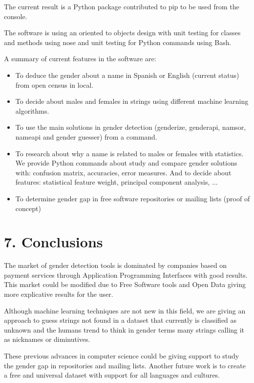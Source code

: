 \documentclass[fleqn,10pt]{wlpeerj} %
\begin{document}
The current result is a Python package contributed to pip to be used
from the console.

The software is using an oriented to objects design with unit testing
for classes and methods using nose and unit testing for Python
commands using Bash. 

A summary of current features in the software are:

\begin{itemize}[noitemsep]
\item To deduce the gender about a name in Spanish or English (current
  status) from open census in local.
\item To decide about males and females in strings using different
  machine learning algorithms.
\item To use the main solutions in gender detection (genderize, genderapi,
namsor, nameapi and gender guesser) from a command.
\item To research about why a name is related to males or females with
  statistics. We provide Python commands about study and compare
  gender solutions with: confusion matrix, accuracies, error
  measures. And to decide about features: statistical feature weight,
  principal component analysis, ...
\item To determine gender gap in free software repositories or mailing
  lists (proof of concept)
\end{itemize}

\section*{7. Conclusions}

The market of gender detection tools is dominated by companies based
on payment services through Application Programming Interfaces with
good results. This market could be modified due to Free Software
tools and Open Data giving more explicative results for the user.

Although machine learning techniques are not new in this field, we
are giving an approach to guess strings not found in a dataset that
currently is classified as unknown and the humans trend to think in
gender terms many strings calling it as nicknames or diminutives.

These previous advances in computer science could be giving support to
study the gender gap in repositories and mailing lists. Another future
work is to create a free and universal dataset with support for all
languages and cultures.


\end{document}
